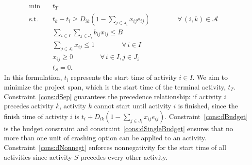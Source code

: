 \documentclass[11pt]{article}
\begin{document}
	\begin{subequations} \label{prob:static}
		\begin{align}
		\min \quad & t_T &\\
		\text{s.t.} \quad &  t_k - t_i \geq D_{ik}\left(1 - \sum_{j \in J_i} x_{ij} e_{ij}\right) \qquad \qquad \forall \,(i,k) \in \mathcal{A} \label{cons:dSep}\\
		& \sum_{i \in I} \sum_{j \in J_i} b_{ij}x_{ij} \leq B  \label{cons:dBudget}\\
		& \sum_{j \in J_i} x_{ij} \leq 1  \qquad \qquad \forall \,i \in I \label{cons:dSingleBudget}\\
		& x_{ij} \geq 0  \qquad \qquad \forall \,i \in I, j \in J_i \label{cons:dxub}\\
		& t_S = 0. \label{cons:dNonnegt}
		\end{align}
	\end{subequations}
	In this formulation, \(t_i\) represents the start time of activity \(i \in I\). We aim to minimize the project span, which is the start time of the terminal activity, \(t_T\). Constraint~\eqref{cons:dSep} guarantees the precedence relationship: if activity \(i\) precedes activity \(k\), activity \(k\) cannot start until activity \(i\) is finished, since the finish time of activity \(i\) is \(t_i + D_{ik} (1- \sum_{j \in J_i} x_{ij}e_{ij})\). Constraint~\eqref{cons:dBudget} is the budget constraint and constraint~\eqref{cons:dSingleBudget} ensures that no more than one unit of crashing option can be applied to an activity. Constraint~\eqref{cons:dNonnegt} enforces nonnegativity for the start time of all activities since activity \(S\) precedes every other activity.\\
	\newline
\end{document}
